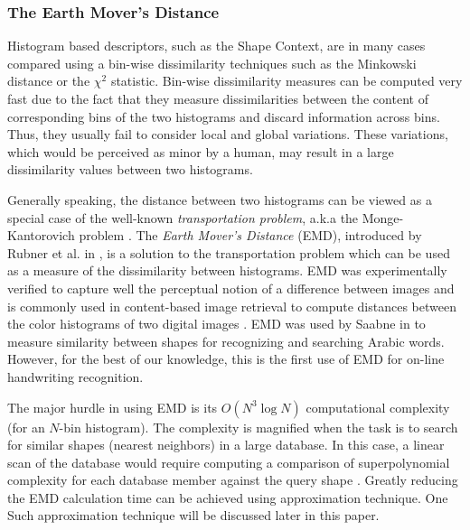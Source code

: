 \documentclass[10pt, conference, compsocconf]{IEEEtran}
\theoremstyle{definition}
\begin{document}
\subsubsection{The Earth Mover's Distance}
Histogram based descriptors, such as the Shape Context, are in many cases compared using a bin-wise dissimilarity techniques such as the Minkowski distance or the $\chi^2$ statistic.
Bin-wise dissimilarity measures can be computed very fast due to the fact that they measure dissimilarities between the content of corresponding bins of the two histograms and discard information across bins. 
Thus, they usually fail to consider local and global variations. 
These variations, which would be perceived as minor by a human, may result in a large dissimilarity values between two histograms. 

Generally speaking, the distance between two histograms can be viewed as a special case of the well-known \emph{transportation problem}, a.k.a the Monge-Kantorovich problem \cite{rachev1985monge}.
The \emph{Earth Mover's Distance} (EMD), introduced by Rubner et al. in \cite{rubner2000earth}, is a solution to the transportation problem which can be used as a measure of the dissimilarity between histograms. 
EMD was experimentally verified to capture well the perceptual notion of a difference between images and is commonly used in content-based image retrieval to compute distances between the color histograms of two digital images \cite{grauman2004fast}.
EMD was used by Saabne in \cite{saabni2013efficient} to measure similarity between shapes for recognizing and searching Arabic words. 
However, for the best of our knowledge, this is the first use of EMD for on-line handwriting recognition.

The major hurdle in using EMD is its $O\left( {{N^3}\log N} \right)$ computational complexity (for an $N$-bin histogram). The complexity is magnified when the task is to search for similar shapes (nearest neighbors) in a large database. 
In this case, a linear scan of the database would require computing a comparison of superpolynomial complexity for each database member against the query shape \cite{grauman2004fast}. 
Greatly reducing the EMD calculation time can be achieved using approximation technique. 
One Such approximation technique will be discussed later in this paper. 
\end{document}
